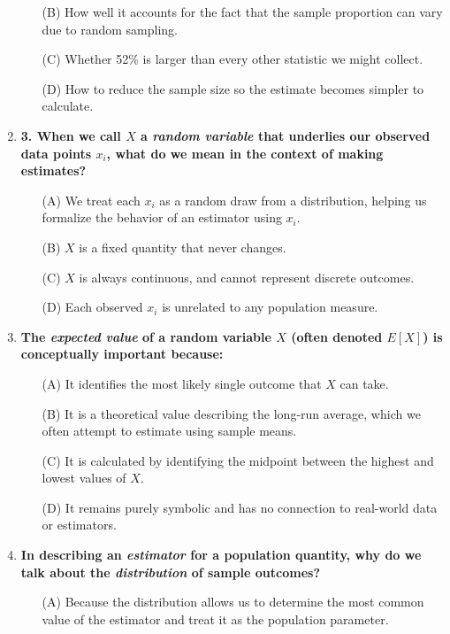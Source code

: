 \documentclass{article}
\begin{document}
\begin{enumerate}
\begin{enumerate}
        \item[(B)] How well it accounts for the fact that the sample proportion can vary due to random sampling.
        \item[(C)] Whether 52\% is larger than every other statistic we might collect.
        \item[(D)] How to reduce the sample size so the estimate becomes simpler to calculate.
        \end{enumerate} 
    \item  \textbf{3. When we call $X$ a \emph{random variable} that underlies our observed data points $x_i$, what do we mean in the context of making estimates?}
        \begin{enumerate}
        \item[(A)] We treat each $x_i$ as a random draw from a distribution, helping us formalize the behavior of an estimator using $x_i$.
        \item[(B)] $X$ is a fixed quantity that never changes.
        \item[(C)] $X$ is always continuous, and cannot represent discrete outcomes.
        \item[(D)] Each observed $x_i$ is unrelated to any population measure.
        \end{enumerate}
    \item  \textbf{The \emph{expected value} of a random variable $X$ (often denoted $E[X]$) is conceptually important because:}
        \begin{enumerate}
        \item[(A)] It identifies the most likely single outcome that $X$ can take.
        \item[(B)] It is a theoretical value describing the long-run average, which we often attempt to estimate using sample means.
        \item[(C)] It is calculated by identifying the midpoint between the highest and lowest values of $X$.
        \item[(D)] It remains purely symbolic and has no connection to real-world data or estimators.
        \end{enumerate}
    \item  \textbf{In describing an \emph{estimator} for a population quantity, why do we talk about the \emph{distribution} of sample outcomes?}
        \begin{enumerate}
        \item[(A)] Because the distribution allows us to determine the most common value of the estimator and treat it as the population parameter.

\end{enumerate}
\end{enumerate}
\end{document}
